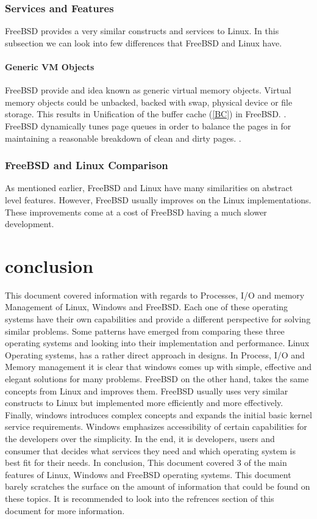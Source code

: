 \documentclass[journal,10pt,onecolumn,compsoc,letterpaper,draftclsnofoot,table,xcdraw]{IEEEtran} \usepackage[margin=0.75in]{geometry}
\begin{document}
\subsubsection{Services and Features}
\noindent FreeBSD provides a very similar constructs and services to Linux. In this subsection we can look into few differences that FreeBSD and Linux have.
\paragraph{Generic VM Objects} FreeBSD provide and idea known as generic virtual memory objects. Virtual memory objects could be unbacked, backed with swap, physical device or file storage. This results in Unification of the buffer cache (\ref{BC}) in FreeBSD. \cite{2-4}. FreeBSD dynamically tunes page queues in order to balance the pages in for maintaining a reasonable breakdown of clean and dirty pages. \cite{2-4}.
\subsubsection{FreeBSD and Linux Comparison}
\noindent As mentioned earlier, FreeBSD and Linux have many similarities on abstract level features. However, FreeBSD usually improves on the Linux implementations. These improvements come at a cost of FreeBSD having a much slower development.
\section{conclusion}
\noindent This document covered information with regards to Processes, I/O and memory Management of Linux, Windows and FreeBSD. Each one of these operating systems have their own capabilities and provide a different perspective for solving similar problems. Some patterns have emerged from comparing these three operating systems and looking into their implementation and performance. Linux Operating systems, has a rather direct approach in designs. In Process, I/O and Memory management it is clear that windows comes up with simple, effective and elegant solutions for many problems. FreeBSD on the other hand, takes the same concepts from Linux and improves them. FreeBSD usually uses very similar constructs to Linux but implemented more efficiently and more effectively. Finally, windows introduces complex concepts and expands the initial basic kernel service requirements. Windows emphasizes accessibility of certain capabilities for the developers over the simplicity. In the end, it is developers, users and consumer that decides what services they need and which operating system is best fit for their needs. In conclusion, This document covered 3 of the main features of Linux, Windows and FreeBSD operating systems. This document barely scratches the surface on the amount of information that could be found on these topics. It is recommended to look into the refrences section of this document for more information.
\newpage


\end{document}

